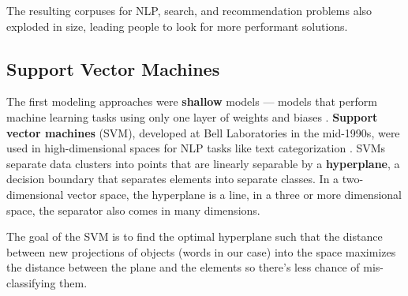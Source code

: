 \documentclass[11pt, table]{diazessay} %
\begin{document}
\begin{sloppypar}
The resulting corpuses for NLP, search, and recommendation problems also exploded in size, leading people to look for more performant solutions.  


\subsection{Support Vector Machines}

The first modeling approaches were \textbf{shallow} models --- models that perform machine learning tasks using only one layer of weights and biases \citep{collobert2008unified}. \textbf{Support vector machines} (SVM), developed at Bell Laboratories in the mid-1990s,  were used in high-dimensional spaces for NLP tasks like text categorization \citep{joachims2005text}. SVMs separate data clusters into points that are linearly separable by a \textbf{hyperplane}, a decision boundary that separates elements into separate classes. In a two-dimensional vector space, the hyperplane is a line, in a three or more dimensional space, the separator also comes in many dimensions.

The goal of the SVM is to find the optimal hyperplane such that the distance between new projections of objects (words in our case) into the space maximizes the distance between the plane and the elements so there's less chance of mis-classifying them.

\begin{figure}[H]
\centering
{}
\end{figure}
\end{sloppypar}
\end{document}
